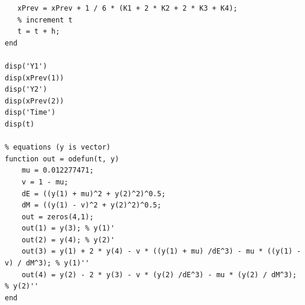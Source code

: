 \documentclass[]{article}
\begin{document}
\begin{verbatim}
   xPrev = xPrev + 1 / 6 * (K1 + 2 * K2 + 2 * K3 + K4);
   % increment t
   t = t + h;
end

disp('Y1')
disp(xPrev(1))
disp('Y2')
disp(xPrev(2))
disp('Time')
disp(t)

% equations (y is vector)
function out = odefun(t, y)
    mu = 0.012277471;
    v = 1 - mu;
    dE = ((y(1) + mu)^2 + y(2)^2)^0.5;
    dM = ((y(1) - v)^2 + y(2)^2)^0.5;
    out = zeros(4,1);
    out(1) = y(3); % y(1)'
    out(2) = y(4); % y(2)'
    out(3) = y(1) + 2 * y(4) - v * ((y(1) + mu) /dE^3) - mu * ((y(1) - v) / dM^3); % y(1)''
    out(4) = y(2) - 2 * y(3) - v * (y(2) /dE^3) - mu * (y(2) / dM^3); % y(2)''
end
\end{verbatim}
\end{document}
